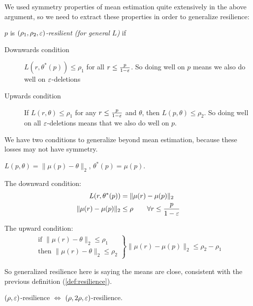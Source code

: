 We used symmetry properties of mean estimation quite extensively in the above
argument, so we need to extract these properties in order to generalize
resilience:

\begin{definition}\label{def:resilience-general}
  $p$ is \emph{$(\rho_1, \rho_2, \varepsilon)$-resilient (for general $L$)} if
  \begin{description}
    \item[Downwards condition] $L(r, \theta^*(p)) \leq \rho_1$ for all $r \leq \frac{p}{1-\varepsilon}$.
      So doing well on $p$ means we also do well on $\varepsilon$-deletions
    \item[Upwards condition] If $L(r, \theta) \leq \rho_1$ for any $r \leq \frac{p}{1-\varepsilon}$
      and $\theta$, then $L(p, \theta) \leq \rho_2$. So doing well
      on all $\varepsilon$-deletions means that we also do well on $p$.
  \end{description}
  We have two conditions to generalize beyond mean estimation, because these
  losses may not have symmetry.
\end{definition}

\begin{example}
  $L(p, \theta) = \|\mu(p) - \theta\|_2$, $\theta^*(p) = \mu(p)$.

  The downward condition:
  \begin{align}
    L(r, \theta^*(p)) &= \|\mu(r) - \mu(p)\|_2 \\
    \|\mu(r) - \mu(p)\|_2 &\leq \rho \qquad \forall r \leq \frac{p}{1-\varepsilon}
  \end{align}

  The upward condition:
  \begin{align}
    \left.
    \begin{array}{c}
      \text{if }\|\mu(r) - \theta\|_2 \leq \rho_1 \\
      \text{then } \|\mu(r) - \theta\|_2 \leq \rho_2
    \end{array}
    \right\}
    \|\mu(r) - \mu(p)\|_2 \leq \rho_2 - \rho_1
  \end{align}

  So generalized resilience here is saying the means are close, consistent
  with the previous definition (\cref{def:resilience}).
\end{example}

$(\rho,\varepsilon)$-resilience $\iff$ $(\rho, 2\rho, \varepsilon)$-resilience.

